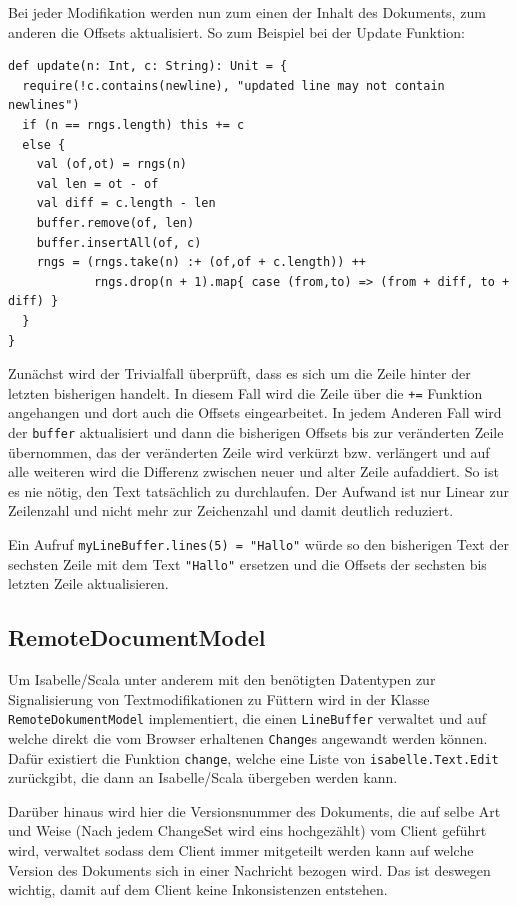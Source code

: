 Bei jeder Modifikation werden nun zum einen der Inhalt des Dokuments, zum anderen die Offsets
aktualisiert. So zum Beispiel bei der Update Funktion:

\begin{lstlisting}
def update(n: Int, c: String): Unit = {
  require(!c.contains(newline), "updated line may not contain newlines")
  if (n == rngs.length) this += c
  else {      
    val (of,ot) = rngs(n)
    val len = ot - of
    val diff = c.length - len
    buffer.remove(of, len)
    buffer.insertAll(of, c)
    rngs = (rngs.take(n) :+ (of,of + c.length)) ++ 
            rngs.drop(n + 1).map{ case (from,to) => (from + diff, to + diff) }
  }
}    
\end{lstlisting}

Zunächst wird der Trivialfall überprüft, dass es sich um die Zeile hinter der letzten bisherigen
handelt. In diesem Fall wird die Zeile über die \texttt{+=} Funktion angehangen und dort auch die
Offsets eingearbeitet. In jedem Anderen Fall wird der \texttt{buffer} aktualisiert und dann die
bisherigen Offsets bis zur veränderten Zeile übernommen, das der veränderten Zeile wird verkürzt
bzw. verlängert und auf alle weiteren wird die Differenz zwischen neuer und alter Zeile aufaddiert.
So ist es nie nötig, den Text tatsächlich zu durchlaufen. Der Aufwand ist nur Linear zur Zeilenzahl
und nicht mehr zur Zeichenzahl und damit deutlich reduziert.

Ein Aufruf \texttt{myLineBuffer.lines(5) = "Hallo"} würde so den bisherigen Text der sechsten Zeile
mit dem Text \texttt{"Hallo"} ersetzen und die Offsets der sechsten bis letzten Zeile aktualisieren.

\subsection{RemoteDocumentModel}

Um Isabelle/Scala unter anderem mit den benötigten Datentypen zur Signalisierung von
Textmodifikationen zu Füttern wird in der Klasse \texttt{RemoteDokumentModel} implementiert, die
einen \texttt{LineBuffer} verwaltet und auf welche direkt die vom Browser erhaltenen
\texttt{Change}s angewandt werden können. Dafür existiert die Funktion \texttt{change}, welche eine
Liste von \texttt{isabelle.Text.Edit} zurückgibt, die dann an Isabelle/Scala übergeben werden kann.

Darüber hinaus wird hier die Versionsnummer des Dokuments, die auf selbe Art und Weise (Nach jedem
ChangeSet wird eins hochgezählt) vom Client geführt wird, verwaltet sodass dem Client immer
mitgeteilt werden kann auf welche Version des Dokuments sich in einer Nachricht bezogen wird. Das
ist deswegen wichtig, damit auf dem Client keine Inkonsistenzen entstehen.

